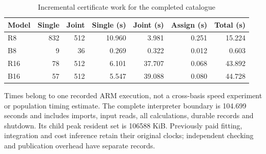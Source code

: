 \begin{table}[htbp]
\centering
\caption{Incremental certificate work for the completed catalogue}\label{tab:work84}
{\small\setlength{\tabcolsep}{3pt}
\begin{tabular}{lrrrrrr}
\hline
Model & Single & Joint & Single (s) & Joint (s) & Assign (s) & Total (s) \\
\hline
R8 & 832 & 512 & 10.960 & 3.981 & 0.251 & 15.224 \\
B8 & 9 & 36 & 0.269 & 0.322 & 0.012 & 0.603 \\
R16 & 78 & 512 & 6.101 & 37.707 & 0.068 & 43.892 \\
B16 & 57 & 512 & 5.547 & 39.088 & 0.080 & 44.728 \\
\hline
\end{tabular}}
\par\smallskip
{\footnotesize Times belong to one recorded ARM execution, not a cross-basis speed experiment or population timing estimate. The complete interpreter boundary is 104.699 seconds and includes imports, input reads, all calculations, durable records and shutdown. Its child peak resident set is 106588 KiB. Previously paid fitting, integration and cost inference retain their original clocks; independent checking and publication overhead have separate records.}
\end{table}
